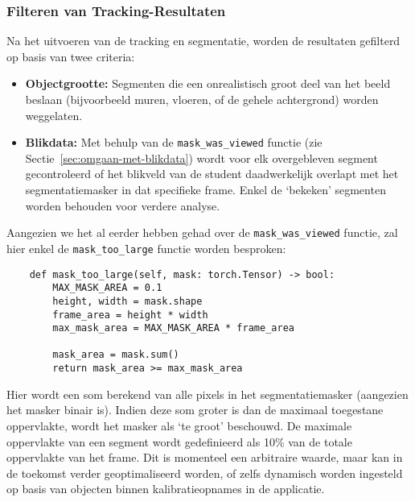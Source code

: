\subsubsection{Filteren van Tracking-Resultaten}


Na het uitvoeren van de tracking en segmentatie, worden de resultaten gefilterd op basis van twee criteria:
\begin{itemize}
    \item \textbf{Objectgrootte:} Segmenten die een onrealistisch groot deel van het beeld beslaan (bijvoorbeeld muren, vloeren, of de gehele achtergrond) worden weggelaten.
    \item \textbf{Blikdata:} Met behulp van de \texttt{mask\_was\_viewed} functie (zie Sectie~\ref{sec:omgaan-met-blikdata}) 
    wordt voor elk overgebleven segment gecontroleerd of het blikveld van de student daadwerkelijk overlapt met het segmentatiemasker in dat specifieke frame. 
    Enkel de `bekeken' segmenten worden behouden voor verdere analyse.
\end{itemize}

Aangezien we het al eerder hebben gehad over de \texttt{mask\_was\_viewed} functie, 
zal hier enkel de \texttt{mask\_too\_large} functie worden besproken:

\begin{listing}[H]
  \begin{verbatim}
    def mask_too_large(self, mask: torch.Tensor) -> bool:
        MAX_MASK_AREA = 0.1
        height, width = mask.shape
        frame_area = height * width
        max_mask_area = MAX_MASK_AREA * frame_area

        mask_area = mask.sum()
        return mask_area >= max_mask_area
    \end{verbatim}
  \caption[Filteren van segmenten op basis van grootte]{}
\end{listing}

Hier wordt een som berekend van alle pixels in het segmentatiemasker (aangezien het masker binair is).
Indien deze som groter is dan de maximaal toegestane oppervlakte, wordt het masker als `te groot' beschouwd.
De maximale oppervlakte van een segment wordt gedefinieerd als 10\% van de totale oppervlakte van het frame.
Dit is momenteel een arbitraire waarde, maar kan in de toekomst verder geoptimaliseerd worden, of zelfs 
dynamisch worden ingesteld op basis van objecten binnen kalibratieopnames in de applicatie.

